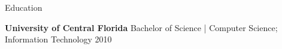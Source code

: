 \documentclass{resume} %
\begin{document}
\vspace{0.5em} %
\begin{rSection}{Education}
  
  {\bf University of Central Florida } Bachelor of Science | Computer Science; Information Technology  \hfill 2010
  
\end{rSection}
\end{document}
